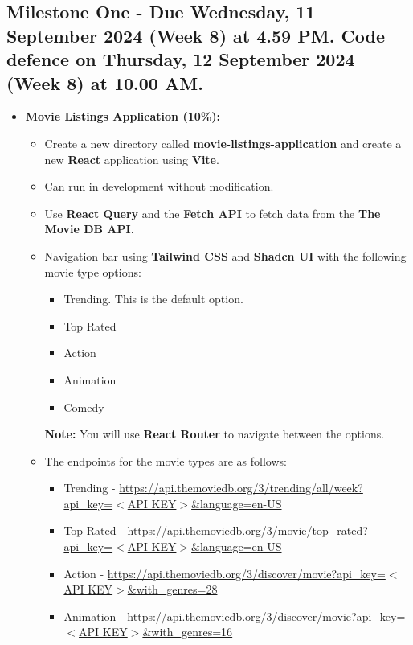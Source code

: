 \documentclass{article}
\begin{document}
\subsection*{Milestone One - Due Wednesday, 11 September 2024 (Week 8) at 4.59 PM. Code defence on Thursday, 12 September 2024 (Week 8) at 10.00 AM.}
\begin{itemize} 
	\item \textbf{Movie Listings Application (10\%):}
	\begin{itemize}
		\item Create a new directory called \textbf{movie-listings-application} and create a new \textbf{React} application using \textbf{Vite}.
		\item Can run in development without modification.
		\item Use \textbf{React Query} and the \textbf{Fetch API} to fetch data from the \textbf{The Movie DB API}.
		\item Navigation bar using \textbf{Tailwind CSS} and \textbf{Shadcn UI} with the following movie type options:
		\begin{itemize}
			\item Trending. This is the default option.
			\item Top Rated
			\item Action
			\item Animation
			\item Comedy
		\end{itemize}
		\textbf{Note:} You will use \textbf{React Router} to navigate between the options.
		\item The endpoints for the movie types are as follows:
	\begin{itemize}
		\item Trending - \href{https://api.themoviedb.org/3/trending/all/week?api\_key=$<$API KEY$>$\&language=en-US}{https://api.themoviedb.org/3/trending/all/week?api\_key=$<$API KEY$>$\&language=en-US}
		\item Top Rated - \href{https://api.themoviedb.org/3/movie/top\_rated?api\_key=$<$API KEY$>$\&language=en-US}{https://api.themoviedb.org/3/movie/top\_rated?api\_key=$<$API KEY$>$\&language=en-US}
		\item Action - \href{https://api.themoviedb.org/3/discover/movie?api\_key=$<$API KEY$>$\&with\_genres=28}{https://api.themoviedb.org/3/discover/movie?api\_key=$<$API KEY$>$\&with\_genres=28}
		\item Animation - \href{https://api.themoviedb.org/3/discover/movie?api\_key=$<$API KEY$>$\&with\_genres=16}{https://api.themoviedb.org/3/discover/movie?api\_key=$<$API KEY$>$\&with\_genres=16}

\end{itemize}
\end{itemize}
\end{itemize}
\end{document}
